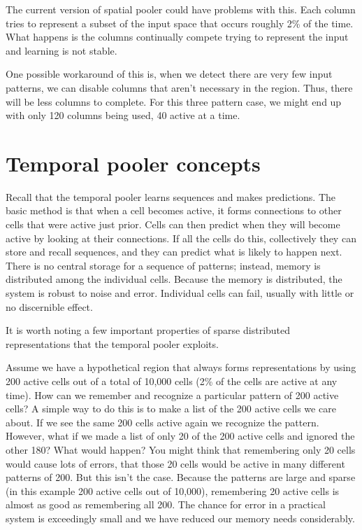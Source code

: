 \documentclass{report}
\begin{document}
\begin{enumerate}
The current version of spatial pooler could have problems with this.  Each column
tries to represent a subset of the input space that occurs roughly 2\% of the time.
What happens is the columns continually compete trying to represent the input and
learning is not stable.

One possible workaround of this is, when we detect there are very few input patterns,
we can disable columns that aren't necessary in the region.  Thus, there will be
less columns to complete.  For this three pattern case, we might end up with only
120 columns being used, 40 active at a time.

\end{enumerate}


\section*{Temporal pooler concepts}

Recall that the temporal pooler learns sequences and makes
predictions. The basic method is that when a cell becomes active, it
forms connections to other cells that were active just prior. Cells
can then predict when they will become active by looking at their
connections. If all the cells do this, collectively they can store and
recall sequences, and they can predict what is likely to happen
next. There is no central storage for a sequence of patterns; instead,
memory is distributed among the individual cells. Because the memory
is distributed, the system is robust to noise and error. Individual
cells can fail, usually with little or no discernible effect.

It is worth noting a few important properties of sparse distributed
representations that the temporal pooler exploits.

Assume we have a hypothetical region that always forms representations
by using 200 active cells out of a total of 10,000 cells (2\% of the
cells are active at any time). How can we remember and recognize a
particular pattern of 200 active cells? A simple way to do this is to
make a list of the 200 active cells we care about. If we see the same
200 cells active again we recognize the pattern. However, what if we
made a list of only 20 of the 200 active cells and ignored the other
180? What would happen? You might think that remembering only 20 cells
would cause lots of errors, that those 20 cells would be active in
many different patterns of 200. But this isn't the case. Because the
patterns are large and sparse (in this example 200 active cells out of
10,000), remembering 20 active cells is almost as good as remembering
all 200. The chance for error in a practical system is exceedingly
small and we have reduced our memory needs considerably.
\end{document}

